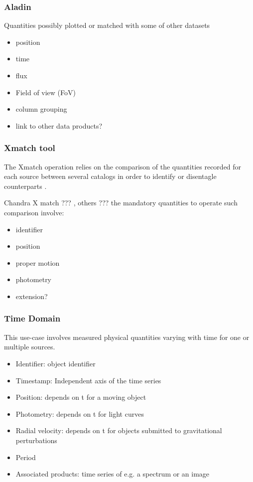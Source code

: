 \documentclass[11pt,a4paper]{ivoa}
\begin{document}
\subsubsection{Aladin}

Quantities possibly plotted or matched with some of other datasets
\begin{itemize}
    \item position
    \item time
    \item flux
    \item Field of view (FoV)
    \item column grouping
    \item link to other data products?
\end{itemize}

\subsubsection{X\-match tool }
The Xmatch operation relies on the comparison of the quantities recorded for each source between several catalogs in order to identify or disentagle counterparts .

Chandra X match ??? , others ???
the mandatory quantities to operate such comparison involve:
\begin{itemize}
    \item identifier
    \item position
    \item proper motion
    \item photometry
    \item extension?
\end{itemize}

\subsubsection{Time Domain }

This use-case involves measured physical quantities varying with time for one or multiple sources.


 \begin{itemize}
    \item Identifier: object identifier
    \item Timestamp: Independent axis of the time series
    \item Position: depends on t for a moving object
    \item Photometry: depends on t for light curves
    \item Radial velocity: depends on t for objects submitted to gravitational perturbations
    \item Period
    \item Associated products: time series of e.g. a spectrum or an image

\end{itemize}
\end{document}
